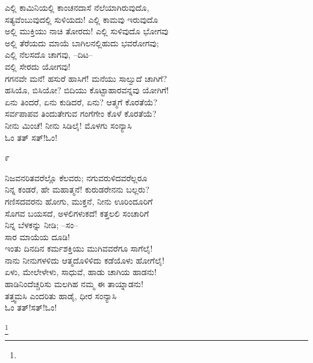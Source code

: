 \begin{myquote}
ಎಲ್ಲಿ ಕಾಮಿನಿಯಲ್ಲಿ ಕಾಂಚನದಾಸೆ ನೆಲೆಯಾಗಿರುವುದೊ,\\ಸತ್ಯವೆಂಬುವುದಲ್ಲಿ ಸುಳಿಯದು! ಎಲ್ಲಿ ಕಾಮವು ಇರುವುದೊ\\ಅಲ್ಲಿ ಮುಕ್ತಿಯು ನಾಚಿ ತೋರದು! ಎಲ್ಲಿ ಸುಳಿವುದೊ ಭೋಗವು\\ಅಲ್ಲಿ ತೆರೆಯದು ಮಾಯೆ ಬಾಗಿಲನಲ್ಲಿಹುದು ಭವರೋಗವು;\\ಎಲ್ಲಿ ನೆಲಸದೊ ಚಾಗವು, –ದಿಟ–\\ವಲ್ಲಿ ಸೇರದು ಯೋಗವು!\\ಗಗನವೇ ಮನೆ! ಹಸುರೆ ಹಾಸಿಗೆ! ಮನೆಯು ಸಾಲ್ವುದೆ ಚಾಗಿಗೆ?\\ಹಸಿಯೊ, ಬಿಸಿಯೋ? ಬಿದಿಯು ಕೊಟ್ಟಾಹಾರವನ್ನವು ಯೋಗಿಗೆ!\\ಏನು ತಿಂದರೆ, ಏನು ಕುಡಿದರೆ, ಏನು? ಆತ್ಮಗೆ ಕೊರತೆಯೆ?\\ಸರ್ವಪಾಪವ ತಿಂದುತೇಗುವ ಗಂಗೆಗೇಂ ಕೊಳೆ ಕೊರತೆಯೆ?\\ನೀನು ಮಿಂಚೆ! ನೀನು ಸಿಡಿಲೈ! ಮೊಳಗು ಸಂನ್ಯಾಸಿ\\ಓಂ ತತ್ ಸತ್!ಓಂ!
\end{myquote}

\begin{center}
೯
\end{center}

\begin{myquote}
ನಿಜವನರಿತವರೆಲ್ಲೊ ಕೆಲವರು; ನಗುವರುಳಿದವರೆಲ್ಲರೂ\\ನಿನ್ನ ಕಂಡರೆ, ಹೇ ಮಹಾತ್ಮನೆ! ಕುರುಡರೇನನು ಬಲ್ಲರು?\\ಗಣಿಸದವರನು ಹೋಗು, ಮುಕ್ತನೆ, ನೀನು ಊರಿಂದೂರಿಗೆ\\ಸೊಗವ ಬಯಸದೆ, ಅಳಲಿಗಳುಕದೆ! ಕತ್ತಲಲಿ ಸಂಚಾರಿಗೆ\\ನಿನ್ನ ಬೆಳಕನ್ನು ನೀಡಿ; –ಸಂ–\\ಸಾರ ಮಾಯೆಯ ದೂಡಿ!\\ಇಂತು ದಿನದಿನ ಕರ್ಮಶಕ್ತಿಯು ಮುಗಿವವರೆಗೂ ಸಾಗೆಲೈ!\\ನಾನು ನೀನುಗಳಳಿದು ಆತ್ಮದೊಳಿಳಿದು ಕಡೆಯೊಳು ಹೋಗೆಲೈ!\\ಏಳು, ಮೇಲೇಳೇಳು, ಸಾಧುವೆ, ಹಾಡು ಚಾಗಿಯ ಹಾಡನು!\\ಹಾಡಿನಿಂದೆಚ್ಚರಿಸು ಮಲಗಿಹ ನಮ್ಮ ಈ ತಾಯ್ನಾಡನು!\\ತತ್ತ್ವಮಸಿ ಎಂದರಿತು ಹಾಡೈ, ಧೀರ ಸಂನ್ಯಾಸಿ\\ಓಂ ತತ್!ಸತ್!ಓಂ!
\end{myquote}

\protect\footnote{}

\begin{myquote}
\end{myquote}

